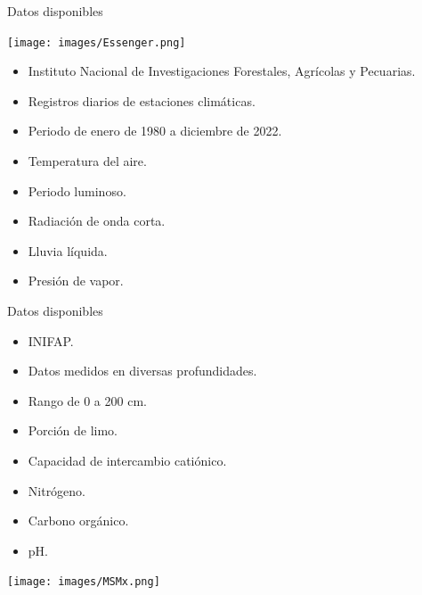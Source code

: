 \documentclass[aspectratio=169]{beamer}
\begin{document}
\begin{frame}{Datos disponibles}
    \vspace{-1cm}
    \begin{minipage}{0.5\textwidth}
			\hspace{-0.5cm}
            \centering
            \texttt{[image: images/Essenger.png]}
		\end{minipage}%
		\begin{minipage}{0.5\textwidth}
            \begin{block}{}
                \begin{itemize}
                    \item Instituto Nacional de Investigaciones Forestales, Agrícolas y Pecuarias.
				\item Registros diarios de estaciones climáticas.
                    \item Periodo de enero de 1980 a diciembre de 2022.
                    \item Temperatura del aire.
                    \item Periodo luminoso.
                    \item Radiación de onda corta.
                    \item Lluvia líquida.
                    \item Presión de vapor.
			\end{itemize}
            \end{block}
		\end{minipage}
\end{frame}
\begin{frame}{Datos disponibles}
    \vspace{-1cm}
		\begin{minipage}{0.5\textwidth}
            \begin{block}{}
                \begin{itemize}
                    \item INIFAP.
				\item Datos medidos en diversas profundidades.
                    \item Rango de 0 a 200 cm.
                    \item Porción de limo.
                    \item Capacidad de intercambio catiónico.
                    \item Nitrógeno.
                    \item Carbono orgánico.
                    \item pH.
			\end{itemize}
            \end{block}
		\end{minipage}%
        \begin{minipage}{0.5\textwidth}
			\hspace{0cm}
            \centering
            \texttt{[image: images/MSMx.png]}
		\end{minipage}
\end{frame}
\end{document}
